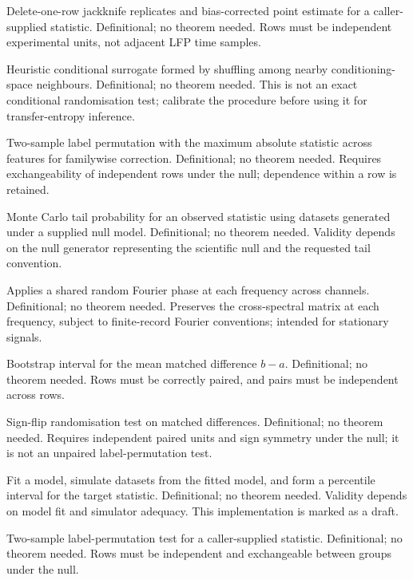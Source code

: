 {Delete-one-row jackknife replicates and bias-corrected point estimate for a caller-supplied statistic.}
{Definitional; no theorem needed.}
{Rows must be independent experimental units, not adjacent LFP time samples.}

{Heuristic conditional surrogate formed by shuffling among nearby conditioning-space neighbours.}
{Definitional; no theorem needed.}
{This is not an exact conditional randomisation test; calibrate the procedure before using it for transfer-entropy inference.}

{Two-sample label permutation with the maximum absolute statistic across features for familywise correction.}
{Definitional; no theorem needed.}
{Requires exchangeability of independent rows under the null; dependence within a row is retained.}

{Monte Carlo tail probability for an observed statistic using datasets generated under a supplied null model.}
{Definitional; no theorem needed.}
{Validity depends on the null generator representing the scientific null and the requested tail convention.}

{Applies a shared random Fourier phase at each frequency across channels.}
{Definitional; no theorem needed.}
{Preserves the cross-spectral matrix at each frequency, subject to finite-record Fourier conventions; intended for stationary signals.}

{Bootstrap interval for the mean matched difference $b-a$.}
{Definitional; no theorem needed.}
{Rows must be correctly paired, and pairs must be independent across rows.}

{Sign-flip randomisation test on matched differences.}
{Definitional; no theorem needed.}
{Requires independent paired units and sign symmetry under the null; it is not an unpaired label-permutation test.}

{Fit a model, simulate datasets from the fitted model, and form a percentile interval for the target statistic.}
{Definitional; no theorem needed.}
{Validity depends on model fit and simulator adequacy. This implementation is marked as a draft.}

{Two-sample label-permutation test for a caller-supplied statistic.}
{Definitional; no theorem needed.}
{Rows must be independent and exchangeable between groups under the null.}

